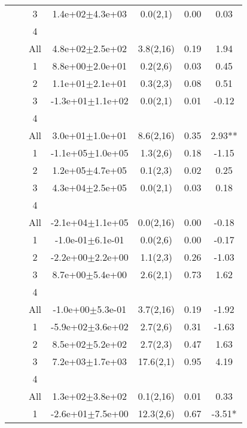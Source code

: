 \begin{longtable}{llccccS[table-format=-2.2, table-space-text-post = {***}]}
   &  & 3 &  1.4e+02$\pm$4.3e+03 & 0.0(2,1) & 0.00 & 0.03 \\ 
   &  & 4 &  &  &  &  \\ 
   &  & All &  4.8e+02$\pm$2.5e+02 & 3.8(2,16) & 0.19 & 1.94 \\ 
   \midrule
{} & {} & 1 &  8.8e+00$\pm$2.0e+01 & 0.2(2,6) & 0.03 & 0.45 \\ 
   &  & 2 &  1.1e+01$\pm$2.1e+01 & 0.3(2,3) & 0.08 & 0.51 \\ 
   &  & 3 & -1.3e+01$\pm$1.1e+02 & 0.0(2,1) & 0.01 & -0.12 \\ 
   &  & 4 &  &  &  &  \\ 
   &  & All &  3.0e+01$\pm$1.0e+01 & 8.6(2,16) & 0.35 & 2.93** \\ 
   \midrule
{} & {} & 1 & -1.1e+05$\pm$1.0e+05 & 1.3(2,6) & 0.18 & -1.15 \\ 
   &  & 2 &  1.2e+05$\pm$4.7e+05 & 0.1(2,3) & 0.02 & 0.25 \\ 
   &  & 3 &  4.3e+04$\pm$2.5e+05 & 0.0(2,1) & 0.03 & 0.18 \\ 
   &  & 4 &  &  &  &  \\ 
   &  & All & -2.1e+04$\pm$1.1e+05 & 0.0(2,16) & 0.00 & -0.18 \\ 
   \midrule
{} & {} & 1 & -1.0e-01$\pm$6.1e-01 & 0.0(2,6) & 0.00 & -0.17 \\ 
   &  & 2 & -2.2e+00$\pm$2.2e+00 & 1.1(2,3) & 0.26 & -1.03 \\ 
   &  & 3 &  8.7e+00$\pm$5.4e+00 & 2.6(2,1) & 0.73 & 1.62 \\ 
   &  & 4 &  &  &  &  \\ 
   &  & All & -1.0e+00$\pm$5.3e-01 & 3.7(2,16) & 0.19 & -1.92 \\ 
   \midrule
{} & {} & 1 & -5.9e+02$\pm$3.6e+02 & 2.7(2,6) & 0.31 & -1.63 \\ 
   &  & 2 &  8.5e+02$\pm$5.2e+02 & 2.7(2,3) & 0.47 & 1.63 \\ 
   &  & 3 &  7.2e+03$\pm$1.7e+03 & 17.6(2,1) & 0.95 & 4.19 \\ 
   &  & 4 &  &  &  &  \\ 
   &  & All &  1.3e+02$\pm$3.8e+02 & 0.1(2,16) & 0.01 & 0.33 \\ 
   \midrule
{} & {} & 1 & -2.6e+01$\pm$7.5e+00 & 12.3(2,6) & 0.67 & -3.51* \\ 

\end{longtable}
